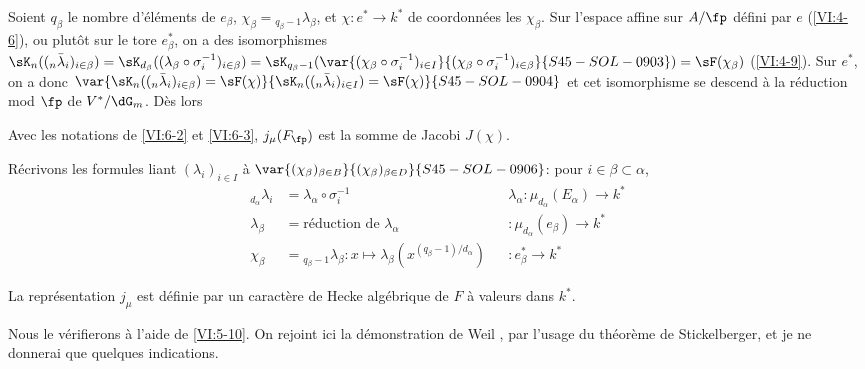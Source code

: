 Soient $q_\beta$ le nombre d'éléments de $e_\beta$, 
$\chi_\beta={}_{q_\beta-1}\lambda_\beta$, et 
$\chi:e^\ast \to k^\ast$ de coordonnées les $\chi_\beta$. Sur l'espace 
affine sur $A/\fp$ défini par $e$ (\ref{VI:4-6}), ou plutôt sur le tore 
$e_\beta^\ast$, on a des isomorphismes 
$\sK_n((_n\bar\lambda_i)_{i\in\beta}) = \sK_{d_\beta}((\lambda_\beta \circ \sigma_i^{-1})_{i\in\beta}) =\sK_{q_\beta-1}(\var{(\chi_\beta\circ \sigma_i^{-1})_{i\in I}}{(\chi_\beta\circ \sigma_i^{-1})_{i\in\beta}}{S45-SOL-0903}) = \sF(\chi_\beta)$ (\ref{VI:4-9}). 
Sur $e^\ast$, on a donc $\var{\sK_n((_n\bar\lambda_i)_{i\in \beta}) = \sF(\chi)}{\sK_n((_n\bar\lambda_i)_{i\in I}) = \sF(\chi)}{S45-SOL-0904}$ 
et cet isomorphisme se descend à la réduction mod $\fp$ de $V^\ast/\dG_m$. 
Dès lors





\begin{proposition_}\label{VI:6-4}
Avec les notations de \ref{VI:6-2} et \ref{VI:6-3}, $j_\mu(F_\fp)$ est la 
somme de Jacobi $J(\chi)$. 
\end{proposition_}

Récrivons les formules liant $(\lambda_i)_{i\in I}$ à 
$\var{(\chi_\beta)_{\beta\in B}}{(\chi_\beta)_{\beta\in D}}{S45-SOL-0906}$: pour $i\in \beta\subset \alpha$, 
\begin{align*}
  _{d_\alpha} \lambda_i &= \lambda_\alpha\circ \sigma_i^{-1} && \lambda_\alpha:\mu_{d_\alpha}(E_\alpha) \to k^\ast \\
  \lambda_\beta &= \text{réduction de $\lambda_\alpha$} && :\mu_{d_\alpha}(e_\beta) \to k^\ast \\
  \chi_\beta &= {}_{q_\beta-1}\lambda_\beta: x\mapsto \lambda_\beta(x^{(q_\beta-1)/d_\alpha}) && :e_\beta^\ast \to k^\ast 
\end{align*}





\begin{theorem_}\label{VI:6-5}
La représentation $j_\mu$ est définie par un caractère de Hecke 
algébrique de $F$ à valeurs dans $k^\ast$. 
\end{theorem_}

Nous le vérifierons à l'aide de \ref{VI:5-10}. On rejoint ici la 
démonstration de Weil \cite{we52,we74-2}, par l'usage du théorème de 
Stickelberger, et je ne donnerai que quelques indications. 





\subsection{}\label{VI:6-6}

